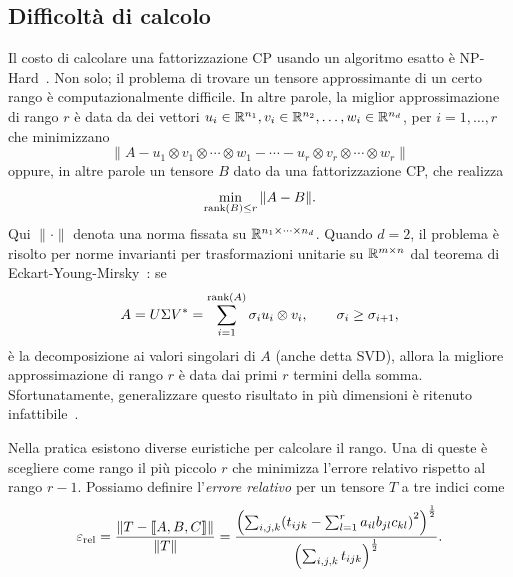 \subsection*{Difficoltà di calcolo}
\label{sec:computing_rank}
Il costo di calcolare una fattorizzazione CP usando un algoritmo esatto è NP-Hard~\cite{haastad1989tensor}. Non
solo; il problema di trovare un tensore approssimante di un certo rango è computazionalmente
difficile. In altre parole, la miglior approssimazione di rango $ r $ è data da dei vettori $ u_{i}
	\in \mathbb{R}^{n_1}, v_{i} \in \mathbb{R}^{n_2}, \ldots, w_{i} \in \mathbb{R}^{n_{d}}   $, per $ i = 1, \ldots, r $ che minimizzano
\begin{equation*}
	\| A - u_1 \otimes v_1 \otimes \cdots \otimes w_1 - \cdots - u_{r} \otimes v_{r} \otimes \cdots
	\otimes w_{r}\|
\end{equation*}
oppure, in altre parole un tensore $ B $ dato da una fattorizzazione CP, che realizza
\begin{equation*}
	\min_{\operatorname{rank}(B) \le r} \| A - B \|.
\end{equation*}
Qui $ \| \cdot \| $ denota una norma fissata su $ \mathbb{R}^{n_1 \times  \cdots \times n_{d}}$. Quando $ d =2$, il
problema è risolto per norme invarianti per trasformazioni unitarie su $ \mathbb{R}^{m \times n} $ dal
teorema di Eckart-Young-Mirsky~\cite{eckart1936approximation}: se
\begin{equation*}
	A = U\Sigma V^* = \sum_{i = 1}^{\operatorname{rank}(A)}\sigma_i u_{i} \otimes v_{i}, \qquad \sigma_{i} \ge
	\sigma_{i+1},
\end{equation*}
è la decomposizione ai valori singolari di $ A $ (anche detta SVD), allora la migliore
approssimazione di rango $ r $ è data dai primi $ r $ termini della somma.
Sfortunatamente, generalizzare questo risultato in più dimensioni è
ritenuto infattibile~\cite{desilva2008tensorrankillposednessbest}.

Nella pratica esistono diverse euristiche per calcolare il rango. Una di queste è scegliere come rango il più piccolo $ r $ che minimizza l'errore
relativo rispetto al rango $ r-1 $. Possiamo definire l'\emph{errore relativo} per un tensore $ T $
a tre indici come
\begin{equation}
	\label{eq:rel_error}
	\varepsilon_{\text{rel}} = \frac{\| T - \dsqr{A,B,C} \|}{\|T\|} = \frac{\left(\sum_{i,j,k}\left( t_{ijk} -
		\sum_{l=1}^r a_{il}b_{jl}c_{kl}\right)^2 \right)^{\frac{1}{2}}}{\left( \sum_{i,j,k}
		t_{ijk}
		\right)^{\frac{1}{2}}}.
\end{equation}


